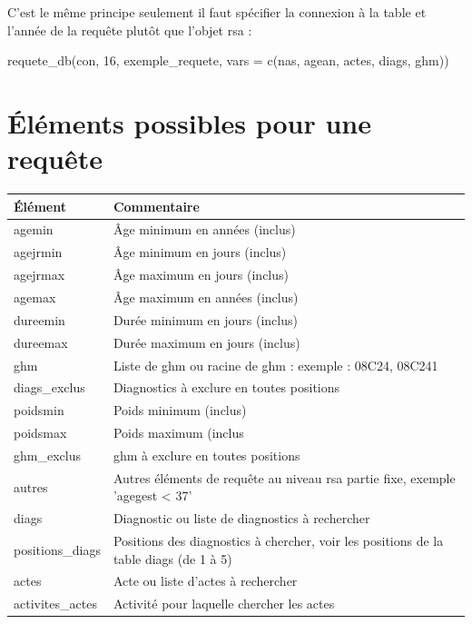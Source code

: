 \documentclass[
]{book}
\newenvironment{Shaded}{\begin{snugshade}}{\end{snugshade}}
\newcommand{\AttributeTok}[1]{\textcolor[rgb]{0.77,0.63,0.00}{#1}}
\newcommand{\DecValTok}[1]{\textcolor[rgb]{0.00,0.00,0.81}{#1}}
\newcommand{\FunctionTok}[1]{\textcolor[rgb]{0.00,0.00,0.00}{#1}}
\newcommand{\NormalTok}[1]{#1}
\newcommand{\StringTok}[1]{\textcolor[rgb]{0.31,0.60,0.02}{#1}}
\begin{document}
C'est le même principe seulement il faut spécifier la connexion à la table et l'année de la requête plutôt que l'objet rsa :

\begin{Shaded}
\begin{Highlighting}[]
\FunctionTok{requete\_db}\NormalTok{(con, }\DecValTok{16}\NormalTok{, exemple\_requete, }\AttributeTok{vars =} \FunctionTok{c}\NormalTok{(}\StringTok{\textquotesingle{}nas\textquotesingle{}}\NormalTok{, }\StringTok{\textquotesingle{}agean\textquotesingle{}}\NormalTok{, }\StringTok{\textquotesingle{}actes\textquotesingle{}}\NormalTok{, }\StringTok{\textquotesingle{}diags\textquotesingle{}}\NormalTok{, }\StringTok{\textquotesingle{}ghm\textquotesingle{}}\NormalTok{))}
\end{Highlighting}
\end{Shaded}

\hypertarget{uxe9luxe9ments-possibles-pour-une-requuxeate}{%
\section{Éléments possibles pour une requête}\label{uxe9luxe9ments-possibles-pour-une-requuxeate}}

\begin{tabular}{l|l}
\hline
Élément & Commentaire\\
\hline
agemin & Âge minimum en années (inclus)\\
\hline
agejrmin & Âge minimum en jours (inclus)\\
\hline
agejrmax & Âge maximum en jours (inclus)\\
\hline
agemax & Âge maximum en années (inclus)\\
\hline
dureemin & Durée minimum en jours (inclus)\\
\hline
dureemax & Durée maximum en jours (inclus)\\
\hline
ghm & Liste de ghm ou racine de ghm : exemple : 08C24, 08C241\\
\hline
diags\_exclus & Diagnostics à exclure en toutes positions\\
\hline
poidsmin & Poids minimum (inclus)\\
\hline
poidsmax & Poids maximum (inclus\\
\hline
ghm\_exclus & ghm à exclure en toutes positions\\
\hline
autres & Autres éléments de requête au niveau rsa partie fixe, exemple 'agegest < 37'\\
\hline
diags & Diagnostic ou liste de diagnostics à rechercher\\
\hline
positions\_diags & Positions des diagnostics à chercher, voir les positions de la table diags (de 1 à 5)\\
\hline
actes & Acte ou liste d'actes à rechercher\\
\hline
activites\_actes & Activité pour laquelle chercher les actes\\
\hline
\end{tabular}
\end{document}
